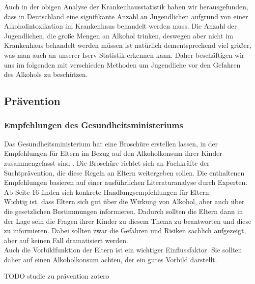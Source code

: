 \documentclass[12pt]{article}
\begin{document}
Auch in der obigen Analyse der Krankenhausstatistik haben wir herausgefunden, dass in Deutschland eine signifikante Anzahl an Jugendlichen aufgrund von einer Alkoholintoxikation im Krankenhaus behandelt werden muss. Die Anzahl der Jugendlichen, die große Mengen an Alkohol trinken, deswegen aber nicht im Krankenhaus behandelt werden müssen ist natürlich dementsprechend viel größer, was man auch an unserer Iserv Statistik erkennen kann. %
Daher beschäftigen wir uns im folgenden mit verschieden Methoden um Jugendliche vor den Gefahren des Alkohols zu beschützen. 

\subsection{Prävention}

\subsubsection{Empfehlungen des Gesundheitsministeriums}
Das Gesundheitsministerium hat eine Broschüre erstellen lassen, in der Empfehlungen für Eltern im Bezug auf den Alkoholkonsum ihrer Kinder zusammengefasst sind \autocite{kuhn_empfehlungen_nodate}. Die Broschüre richtet sich an Fachkräfte der Suchtprävention, die diese Regeln an Eltern weitergeben sollen. Die enthaltenen Empfehlungen basieren auf einer ausführlichen Literaturanalyse durch Experten. Ab Seite 16 finden sich konkrete Handlungsempfehlungen für Eltern:\\
Wichtig ist, dass Eltern sich gut über die Wirkung von Alkohol, aber auch über die gesetzlichen Bestimmungen informieren. Dadurch sollten die Eltern dann in der Lage sein die Fragen ihrer Kinder zu diesem Thema zu beantworten und diese zu informieren. Dabei sollten zwar die Gefahren und Risiken sachlich aufgezeigt, aber auf keinen Fall dramatisiert werden.\\
Auch die Vorbildfunktion der Eltern ist ein wichtiger Einflussfaktor. Sie sollten daher auf einen Alkoholkonsum achten, der ein gutes Vorbild darstellt.

TODO studie zu prävention zotero
\end{document}
